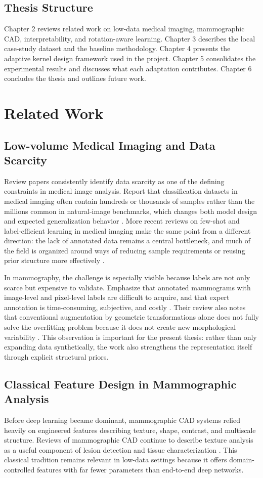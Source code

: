\documentclass{cernatsnote}
\let\oldsection\section
\let\oldsubsection\subsection
\let\oldsubsubsection\subsubsection
\let\chapter\oldsection
\let\section\oldsubsection
\let\subsection\oldsubsubsection
\begin{document}
\section{Thesis Structure}
Chapter 2 reviews related work on low-data medical imaging, mammographic CAD, interpretability, and rotation-aware learning. Chapter 3 describes the local case-study dataset and the baseline methodology. Chapter 4 presents the adaptive kernel design framework used in the project. Chapter 5 consolidates the experimental results and discusses what each adaptation contributes. Chapter 6 concludes the thesis and outlines future work.

\chapter{Related Work}
\section{Low-volume Medical Imaging and Data Scarcity}
Review papers consistently identify data scarcity as one of the defining constraints in medical image analysis. Report that classification datasets in medical imaging often contain hundreds or thousands of samples rather than the millions common in natural-image benchmarks, which changes both model design and expected generalization behavior \citep{litjens2017survey}. More recent reviews on few-shot and label-efficient learning in medical imaging make the same point from a different direction: the lack of annotated data remains a central bottleneck, and much of the field is organized around ways of reducing sample requirements or reusing prior structure more effectively \citep{pachetti2024fewshot}.

In mammography, the challenge is especially visible because labels are not only scarce but expensive to validate. Emphasize that annotated mammograms with image-level and pixel-level labels are difficult to acquire, and that expert annotation is time-consuming, subjective, and costly \citep{gardezi2019mammographic}. Their review also notes that conventional augmentation by geometric transformations alone does not fully solve the overfitting problem because it does not create new morphological variability \citep{gardezi2019mammographic}. This observation is important for the present thesis: rather than only expanding data synthetically, the work also strengthens the representation itself through explicit structural priors.

\section{Classical Feature Design in Mammographic Analysis}
Before deep learning became dominant, mammographic CAD systems relied heavily on engineered features describing texture, shape, contrast, and multiscale structure. Reviews of mammographic CAD continue to describe texture analysis as a useful component of lesion detection and tissue characterization \citep{gardezi2019mammographic}. This classical tradition remains relevant in low-data settings because it offers domain-controlled features with far fewer parameters than end-to-end deep networks.
\end{document}
